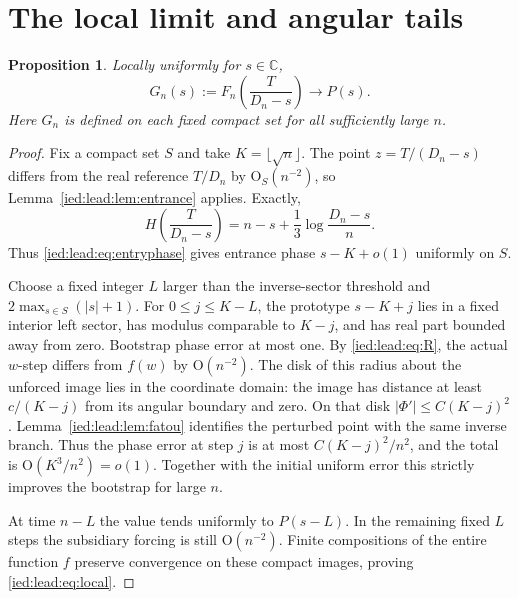 \documentclass[11pt,letterpaper]{article}
\newtheorem{proposition}[theorem]{Proposition}
\theoremstyle{remark}\newtheorem{remark}[theorem]{Remark}
\newcommand{\C}{\mathbb C}\newcommand{\R}{\mathbb R}
\newcommand{\Oh}{\mathrm O}\newcommand{\supp}{\operatorname{supp}}
\begin{document}
\section{The local limit and angular tails}\label{ied:lead:sec:local}
\begin{proposition}\label{ied:lead:prop:local}
Locally uniformly for $s\in\C$,
\begin{equation}\label{ied:lead:eq:local}
 G_n(s):=F_n\left(\frac T{D_n-s}\right)\longrightarrow P(s).
\end{equation}
Here $G_n$ is defined on each fixed compact set for all sufficiently large $n$.
\end{proposition}
\begin{proof}
Fix a compact set $S$ and take $K=\lfloor\sqrt n\rfloor$. The point $z=T/(D_n-s)$ differs from the real reference $T/D_n$ by $\Oh_S(n^{-2})$, so Lemma~\ref{ied:lead:lem:entrance} applies. Exactly,
\[
 H\left(\frac T{D_n-s}\right)=n-s+\frac13\log\frac{D_n-s}{n}.
\]
Thus \eqref{ied:lead:eq:entryphase} gives entrance phase $s-K+o(1)$ uniformly on $S$.

Choose a fixed integer $L$ larger than the inverse-sector threshold and $2\max_{s\in S}(|s|+1)$. For $0\le j\le K-L$, the prototype $s-K+j$ lies in a fixed interior left sector, has modulus comparable to $K-j$, and has real part bounded away from zero. Bootstrap phase error at most one. By \eqref{ied:lead:eq:R}, the actual $w$-step differs from $f(w)$ by $\Oh(n^{-2})$. The disk of this radius about the unforced image lies in the coordinate domain: the image has distance at least $c/(K-j)$ from its angular boundary and zero. On that disk $|\Phi'|\le C(K-j)^2$. Lemma~\ref{ied:lead:lem:fatou} identifies the perturbed point with the same inverse branch. Thus the phase error at step $j$ is at most $C(K-j)^2/n^2$, and the total is $\Oh(K^3/n^2)=o(1)$. Together with the initial uniform error this strictly improves the bootstrap for large $n$.

At time $n-L$ the value tends uniformly to $P(s-L)$. In the remaining fixed $L$ steps the subsidiary forcing is still $\Oh(n^{-2})$. Finite compositions of the entire function $f$ preserve convergence on these compact images, proving \eqref{ied:lead:eq:local}.
\end{proof}
\end{document}
